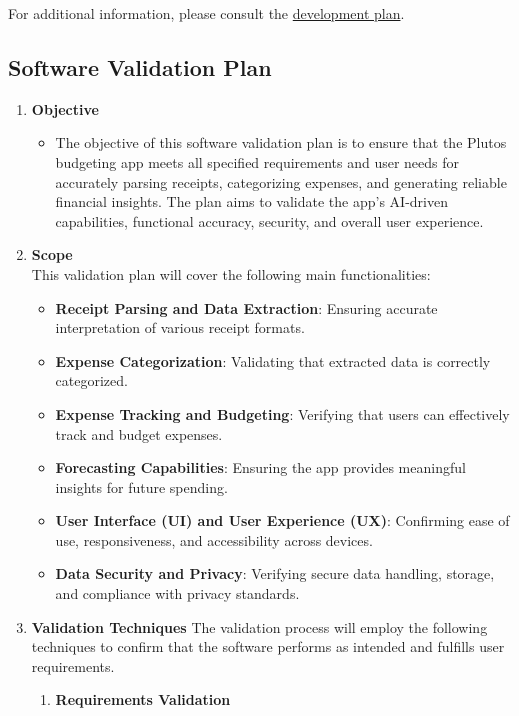 \documentclass[12pt, titlepage]{article}
\begin{document}
\noindent For additional information, please consult the \href{https://github.com/PlutosCapstone/Plutos/blob/main/docs/DevelopmentPlan/DevelopmentPlan.pdf}{development plan}.
\subsection{Software Validation Plan}

\begin{enumerate}
	\item \textbf{Objective}
	\begin{itemize}
		\item The objective of this software validation plan is to ensure that the Plutos budgeting app meets all specified requirements and user needs for accurately parsing receipts, categorizing expenses, and generating reliable financial insights. The plan aims to validate the app’s AI-driven capabilities, functional accuracy, security, and overall user experience.
	\end{itemize}
	\item \textbf{Scope} \\
	This validation plan will cover the following main functionalities:
	\begin{itemize}
		\item \textbf{Receipt Parsing and Data Extraction}: Ensuring accurate interpretation of various receipt formats.
		\item \textbf{Expense Categorization}: Validating that extracted data is correctly categorized.
		\item \textbf{Expense Tracking and Budgeting}: Verifying that users can effectively track and budget expenses.
		\item \textbf{Forecasting Capabilities}: Ensuring the app provides meaningful insights for future spending.
		\item \textbf{User Interface (UI) and User Experience (UX)}: Confirming ease of use, responsiveness, and accessibility across devices.
		\item \textbf{Data Security and Privacy}: Verifying secure data handling, storage, and compliance with privacy standards.
	\end{itemize}
	\newpage
	\item \textbf{Validation Techniques}
	The validation process will employ the following techniques to confirm that the software performs as intended and fulfills user requirements.
	\begin{enumerate}
		\item \textbf{Requirements Validation}

\end{enumerate}
\end{enumerate}
\end{document}
